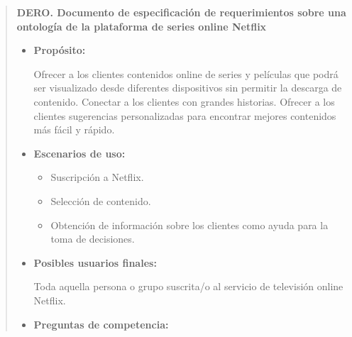 \documentclass[a4paper,10pt,twoside,final,spanish]{article}
\begin{document}
\begin{quote}

\begin{center}
\textbf{DERO. Documento de especificación de requerimientos sobre una ontología de la plataforma de series online Netflix}
\end{center}

\begin{itemize}
\item \textbf{Propósito:}

Ofrecer a los clientes contenidos online de series y películas que podrá ser visualizado desde diferentes dispositivos sin permitir la descarga de contenido.
Conectar a los clientes con grandes historias. Ofrecer a los clientes sugerencias personalizadas para encontrar mejores contenidos más fácil y rápido.

\item \textbf{Escenarios de uso:}

	\begin{itemize}
	\item Suscripción a Netflix.
	\item Selección de contenido.
	\item Obtención de información sobre los clientes como ayuda para la toma de 			decisiones. 
	\end{itemize}

\item \textbf{Posibles usuarios finales:}

Toda aquella persona o grupo suscrita/o al servicio de televisión online Netflix.

\item \textbf{Preguntas de competencia:}


\end{itemize}
\end{quote}
\end{document}
